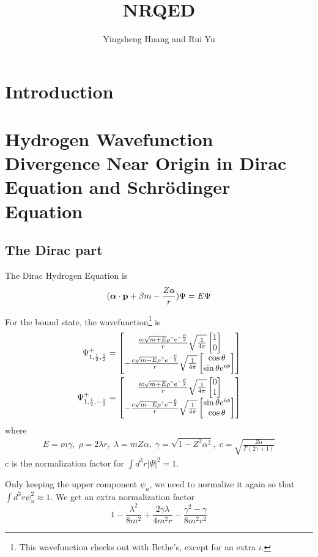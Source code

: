 \documentclass{article}
\title{NRQED}
\author{Yingsheng Huang and Rui Yu}
\newcommand{\vbp}{\vb{p}}
\renewcommand{\a}{\alpha}
\renewcommand{\b}{\beta}
\begin{document}
\maketitle
\section*{Introduction}
\section{Hydrogen Wavefunction Divergence Near Origin in Dirac Equation and Schr\"odinger Equation}
\subsection{The Dirac part}
The Dirac Hydrogen Equation is
\begin{align}
	(\bm{\a}\cdot \vbp+\b m-\frac{Z\a}{r} )\Psi=E\Psi
\end{align}

For the bound state, the wavefunction\footnote{This wavefunction checks out with Bethe's, except for an extra $i$. } is\cite{Darwin1928,Gordon1928,Bethe2008}
\begin{align}
	\Psi^+_{1,\frac{1}{2},\frac{1}{2}}  & =\bmqty{\frac{ic\sqrt{m+E}\rho^{\gamma}e^{-\frac{\rho}{2}}}{r}\sqrt{\frac{1}{4\pi}}\bmqty{1 \\0}\\-\frac{c\sqrt{m-E}\rho^{\gamma}e^{-\frac{\rho}{2}}}{r}\sqrt{\frac{1}{4\pi}}\bmqty{\cos\theta\\\sin\theta e^{i\phi}}}\\
	\Psi^+_{1,\frac{1}{2},-\frac{1}{2}} & =\bmqty{\frac{ic\sqrt{m+E}\rho^{\gamma}e^{-\frac{\rho}{2}}}{r}\sqrt{\frac{1}{4\pi}}\bmqty{0 \\1}\\-\frac{c\sqrt{m-E}\rho^{\gamma}e^{-\frac{\rho}{2}}}{r}\sqrt{\frac{1}{4\pi}}\bmqty{\sin\theta e^{i\phi}\\\cos\theta}}
\end{align}
where
\begin{align}
	E=m\gamma,\;\rho=2\lambda r,\;\lambda=mZ\a,\;
	\gamma=\sqrt{1-Z^2\a^2},\;c=\sqrt{\frac{Z\a}{\Gamma(2\gamma+1)}}
\end{align}
c is the normalization factor for $\int d^3r|\Psi|^2=1$.

Only keeping the upper component $\psi_u$, we need to normalize it again so that $\int d^3r\psi_u^2\approx1$. We get an extra normalization factor
$$1-\frac{\lambda^2}{8m^2}+\frac{2\gamma\lambda}{4m^2r}-\frac{\gamma^2-\gamma}{8m^2r^2}$$
\end{document}
